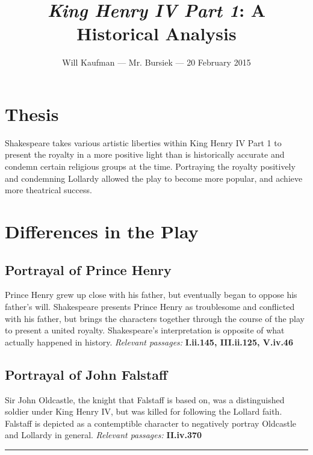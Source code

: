\documentclass[10pt]{article}
\begin{document}
\title{\textit{King Henry IV Part 1}: A Historical Analysis}
\author{Will Kaufman --- Mr. Bursiek --- 20 February 2015}
\date{}
\maketitle

\section*{Thesis}
Shakespeare takes various artistic liberties within King Henry IV Part 1 to present the royalty in a more positive light than is historically accurate and condemn certain religious groups at the time.  Portraying the royalty positively and condemning Lollardy allowed the play to become more popular, and achieve more theatrical success.

\section*{Differences in the Play}
\subsection*{Portrayal of Prince Henry}
Prince Henry grew up close with his father, but eventually began to oppose his father's will.  Shakespeare presents Prince Henry as troublesome and conflicted with his father, but brings the characters together through the course of the play to present a united royalty.  Shakespeare's interpretation is opposite of what actually happened in history.
\textit{Relevant passages: } \textbf{I.ii.145, III.ii.125, V.iv.46}

\subsection*{Portrayal of John Falstaff}
Sir John Oldcastle, the knight that Falstaff is based on, was a distinguished soldier under King Henry IV, but was killed for following the Lollard faith.  Falstaff is depicted as a contemptible character to negatively portray Oldcastle and Lollardy in general.
\textit{Relevant passages: } \textbf{II.iv.370}

\noindent\rule{\textwidth}{1pt}
\end{document}

